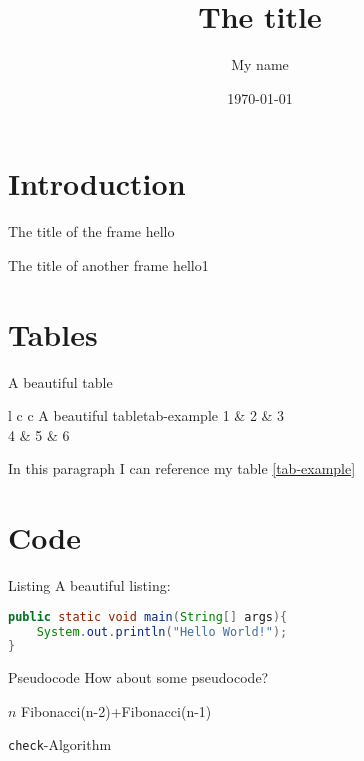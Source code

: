 \documentclass[aspectratio=169]{beamer}
\title{The title}
\author{My name}
\date{\today}
\begin{document}
\titleframe

\section{Introduction}

\begin{frame}{The title of the frame}
	hello
\end{frame}


\begin{frame}{The title of another frame}
	hello1
\end{frame}

\section{Tables}

\begin{frame}{A beautiful table}

	\begin{customtable}{l c c }{A beautiful table}{tab-example}
		1 & 2 & 3 \\
		4 & 5 & 6 \\
	\end{customtable}

	In this paragraph I can reference my table \ref{tab-example}

\end{frame}

\section{Code}

\begin{frame}[fragile]{Listing}
	\large
	A beautiful listing:

\begin{lstlisting}[language=Java]
public static void main(String[] args){
	System.out.println("Hello World!");
}
\end{lstlisting}

\end{frame}

\begin{frame}{Pseudocode}
	\Large
	How about some pseudocode?

	\begin{algorithm}[H]
	\begin{algorithmic}[1]
				\Return $n$
			\Else
				\Return Fibonacci(n-2)+Fibonacci(n-1)
			\EndIf

		\EndFunction
	\end{algorithmic}

	\caption{\texttt{check}-Algorithm}
	\label{alg-check}
	\end{algorithm}

\end{frame}
\end{document}
